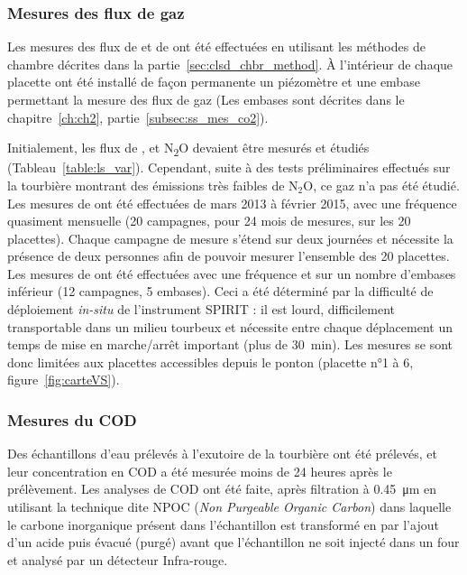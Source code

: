 \subsubsection{Mesures des flux de gaz}

Les mesures des flux de \coo et de \chh ont été effectuées en utilisant les méthodes de chambre décrites dans la partie~\ref{sec:clsd_chbr_method}.
À l'intérieur de chaque placette ont été installé de façon permanente un piézomètre et une embase permettant la mesure des flux de gaz (Les embases sont décrites dans le chapitre~\ref{ch:ch2}, partie~\ref{subsec:ss_mes_co2}).


Initialement, les flux de \coo, \chh et N\textsubscript{2}O devaient être mesurés et étudiés (Tableau~\ref{table:ls_var}).
Cependant, suite à des tests préliminaires effectués sur la tourbière montrant des émissions très faibles de N$_{2}$O, ce gaz n'a pas été étudié.
Les mesures de \coo ont été effectuées de mars 2013 à février 2015, avec une fréquence quasiment mensuelle (20 campagnes, pour 24 mois de mesures, sur les 20 placettes). 
Chaque campagne de mesure s'étend sur deux journées et nécessite la présence de deux personnes afin de pouvoir mesurer l'ensemble des 20 placettes.
Les mesures de \chh ont été effectuées avec une fréquence et sur un nombre d'embases inférieur (12 campagnes, 5 embases).
Ceci a été déterminé par la difficulté de déploiement \textit{in-situ} de l'instrument SPIRIT : il est lourd, difficilement transportable dans un milieu tourbeux et nécessite entre chaque déplacement un temps de mise en marche/arrêt important (plus de \SI{30}{\minute}).
Les mesures se sont donc limitées aux placettes accessibles depuis le ponton (placette n°1 à 6, figure~\ref{fig:carteVS}).


\subsubsection{Mesures du COD}

Des échantillons d'eau prélevés à l'exutoire de la tourbière ont été prélevés, et leur concentration en COD a été mesurée moins de 24 heures après le prélèvement.
Les analyses de COD ont été faite, après filtration à \SI{0.45}{\micro\metre} en utilisant la technique dite NPOC (\textit{Non Purgeable Organic Carbon}) dans laquelle le carbone inorganique présent dans l'échantillon est transformé en \coo par l'ajout d'un acide puis évacué (purgé) avant que l'échantillon ne soit injecté dans un four et analysé par un détecteur Infra-rouge.


